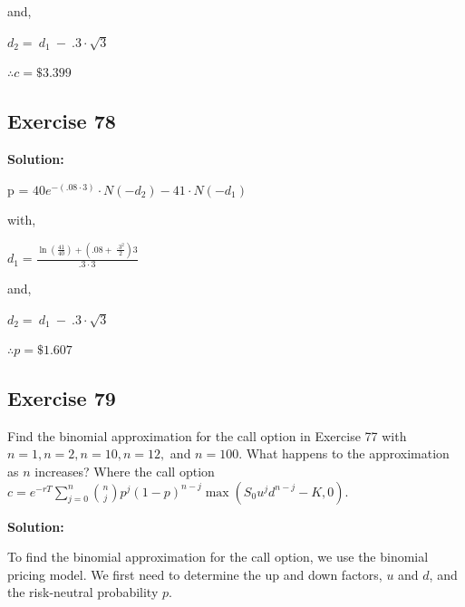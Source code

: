 \documentclass{article}
\begin{document}
\vspace{\baselineskip}

and,

\vspace{\baselineskip}

$d_{2} =\  d_{1}\ -\ .3\cdot\sqrt{3}$

\vspace{\baselineskip}

$\therefore c = \$3.399$

\subsection*{Exercise 78}

\textbf{Solution:}

p = $40e^{-\left(.08\cdot3\right)}\cdot N\left(-d_{2}\right)-41\cdot N\left(-d_{1}\right)$

\vspace{\baselineskip}

with,

\vspace{\baselineskip}

$d_{1}=\frac{\ln\left(\frac{41}{40}\right)+\left(.08+\ \frac{.3^{2}}{2}\right)3}{.3\cdot3}$

\vspace{\baselineskip}

and,

\vspace{\baselineskip}

$d_{2} =\  d_{1}\ -\ .3\cdot\sqrt{3}$

\vspace{\baselineskip}

$\therefore p = \$1.607$

\subsection*{Exercise 79}
Find the binomial approximation for the call option in Exercise 77 with \( n = 1, n = 2, n = 10, n = 12, \) and \( n = 100 \). What happens to the approximation as \( n \) increases? Where the call option \( c = e^{-rT} \sum_{j=0}^{n} \binom{n}{j} p^j (1-p)^{n-j} \max(S_0 u^j d^{n-j} - K, 0) \).

\textbf{Solution:}

To find the binomial approximation for the call option, we use the binomial pricing model. We first need to determine the up and down factors, \( u \) and \( d \), and the risk-neutral probability \( p \).
\end{document}
